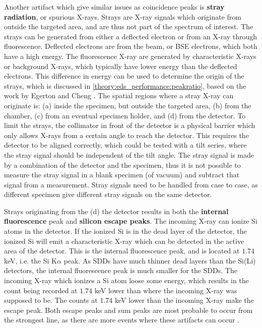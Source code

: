 Another artifact which give similar issues as coincidence peaks is \textbf{stray radiation}, or spurious X-rays.
Strays are X-ray signals which originate from outside the targeted area, and are thus not part of the spectrum of interest.
The strays can be generated from either a deflected electron or from an X-ray through fluorescence.
Deflected electrons are from the beam, or BSE electrons, which both have a high energy.
The fluorescence X-ray are generated by characteristic X-rays or background X-rays, which typically have lower energy than the deflected electrons.
This difference in energy can be used to determine the origin of the strays, which is discussed in \cref{theory:eds_performance:peakratio}, based on the work by Egerton and Cheng \cite{egerton_nio_characterization_1994}.
The spatial regions where a stray X-ray can originate is: (a) inside the specimen, but outside the targeted area, (b) from the chamber, (c) from an eventual specimen holder, and (d) from the detector.
To limit the strays, the collimator in front of the detector is a physical barrier which only allows X-rays from a certain angle to reach the detector.
This requires the detector to be aligned correctly, which could be tested with a tilt series, where the stray signal should be independent of the tilt angle.
The stray signal is made by a combination of the detector and the specimen, thus it is not possible to measure the stray signal in a blank specimen (of vacuum) and subtract that signal from a measurement.
Stray signals need to be handled from case to case, as different specimen give different stray signals on the same detector.


Strays originating from the (d) the detector results in both the \textbf{internal fluorescence} peak and \textbf{silicon escape peaks}.
The incoming X-ray can ionize Si atoms in the detector.
If the ionized Si is in the dead layer of the detector, the ionized Si will emit a characteristic X-ray which can be detected in the active area of the detector.
This is the internal fluorescence peak, and is located at $1.74$ keV, i.e. the Si K$\alpha$ peak.
As SDDs have much thinner dead layers than the Si(Li) detectors, the internal fluorescence peak is much smaller for the SDDs.
The incoming X-ray which ionizes a Si atom loose some energy, which results in the count being recorded at $1.74$ keV lower than where the incoming X-ray was supposed to be.
The counts at $1.74$ keV lower than the incoming X-ray make the escape peak.
Both escape peaks and sum peaks are most probable to occur from the strongest line, as there are more events where these artifacts can occur \cite{astm_e1508_eds_quantification}.


